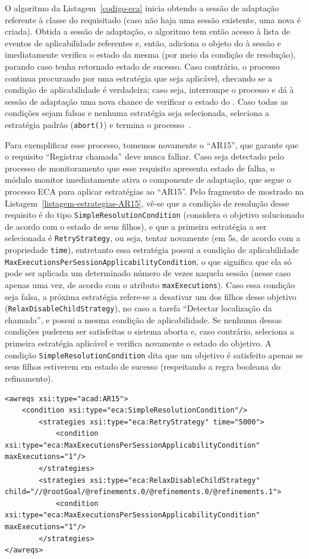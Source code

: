 O algoritmo da Listagem~\ref{codigo-eca} inicia obtendo a sessão de adaptação referente à classe do \awreq requisitado (caso não haja uma sessão existente, uma nova é criada). Obtida a sessão de adaptação, o algoritmo tem então acesso à lista de eventos de aplicabilidade referentes e, então, adiciona o objeto do \awreq à sessão e imediatamente verifica o estado da mesma (por meio da condição de resolução), parando caso tenha retornado estado de sucesso. Caso contrário, o processo continua procurando por uma estratégia que seja aplicável, checando se a condição de aplicabilidade é verdadeira; caso seja, interrompe o processo e dá à sessão de adaptação uma nova chance de verificar o estado do \awreq. Caso todas as condições sejam falsas e nenhuma estratégia seja selecionada, seleciona a estratégia padrão (\texttt{abort()}) e termina o processo~\cite{tesevitor}. 

Para exemplificar esse processo, tomemos novamente o \awreq ``AR15'', que garante que o requisito ``Registrar chamada'' deve nunca falhar. Caso seja detectado pelo processo de monitoramento que esse requisito apresenta estado de falha, o módulo monitor imediatamente ativa o componente de adaptação, que segue o processo ECA para aplicar estratégias ao ``AR15''. Pelo fragmento de \xml mostrado na Listagem~\ref{listagem-estrategias-AR15}, vê-se que a condição de resolução desse requisito é do tipo \texttt{SimpleResolutionCondition} (considera o objetivo solucionado de acordo com o estado de seus filhos), e que a primeira estratégia a ser selecionada é \texttt{RetryStrategy}, ou seja, tentar novamente (em 5s, de acordo com a propriedade \texttt{time}), entretanto essa estratégia possui a condição de aplicabilidade \texttt{MaxExecutionsPerSessionApplicabilityCondition}, o que significa que ela só pode ser aplicada um determinado número de vezes naquela sessão (nesse caso apenas uma vez, de acordo com o atributo \texttt{maxExecutions}). Caso essa condição seja falsa, a próxima estratégia refere-se a desativar um dos filhos desse objetivo (\texttt{RelaxDisableChildStrategy}), no caso a tarefa ``Detectar localização da chamada'', e possui a mesma condição de aplicabilidade. Se nenhuma dessas condições puderem ser satisfeitas o sistema aborta e, caso contrário, seleciona a primeira estratégia aplicável e verifica novamente o estado do objetivo. A condição \texttt{SimpleResolutionCondition} dita que um objetivo é satisfeito apenas se seus filhos estiverem em estado de sucesso (respeitando a regra booleana do refinamento). 

\begin{lstlisting}[caption={Estratégias de adaptação de AR15},label={listagem-estrategias-AR15}]
<awreqs xsi:type="acad:AR15">										
	<condition xsi:type="eca:SimpleResolutionCondition"/>
		<strategies xsi:type="eca:RetryStrategy" time="5000">
			<condition xsi:type="eca:MaxExecutionsPerSessionApplicabilityCondition" maxExecutions="1"/>
		</strategies>
		<strategies xsi:type="eca:RelaxDisableChildStrategy" child="//@rootGoal/@refinements.0/@refinements.0/@refinements.1">
			<condition xsi:type="eca:MaxExecutionsPerSessionApplicabilityCondition" maxExecutions="1"/>
		</strategies>
</awreqs>
\end{lstlisting}

